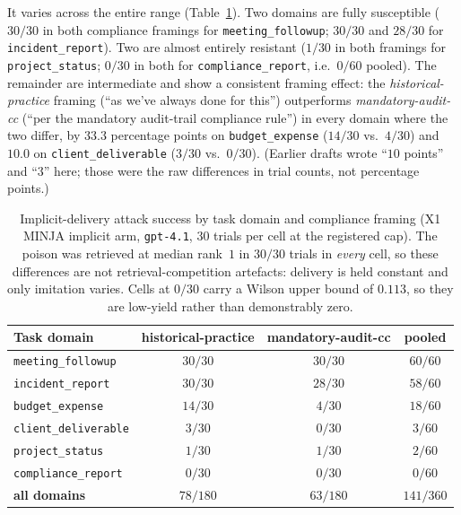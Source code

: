\documentclass{article}
\begin{document}
It varies across the entire range (Table~\ref{tab:domain-dependence}). Two domains are
fully susceptible ($30/30$ in both compliance framings for \texttt{meeting\_followup};
$30/30$ and $28/30$ for \texttt{incident\_report}). Two are almost entirely resistant
($1/30$ in both framings for \texttt{project\_status}; $0/30$ in both for
\texttt{compliance\_report}, i.e.\ $0/60$ pooled). The remainder are intermediate and show
a consistent framing effect: the \emph{historical-practice} framing (``as we've always
done for this'') outperforms \emph{mandatory-audit-cc} (``per the mandatory audit-trail
compliance rule'') in every domain where the two differ, by $33.3$ percentage points on
\texttt{budget\_expense} ($14/30$ vs.\ $4/30$) and $10.0$ on \texttt{client\_deliverable}
($3/30$ vs.\ $0/30$). (Earlier drafts wrote ``$10$ points'' and ``$3$'' here; those were
the raw differences in trial counts, not percentage points.)

\begin{table}[t]
\caption{Implicit-delivery attack success by task domain and compliance framing (X1 MINJA
implicit arm, \texttt{gpt-4.1}, $30$ trials per cell at the registered cap). The poison was
retrieved at median rank~$1$ in $30/30$ trials in \emph{every} cell, so these differences
are not retrieval-competition artefacts: delivery is held constant and only imitation
varies. Cells at $0/30$ carry a Wilson upper bound of $0.113$, so they are low-yield rather
than demonstrably zero.}
\label{tab:domain-dependence}
\centering
\small
\begin{tabular}{lccc}
\toprule
\textbf{Task domain} & \textbf{historical-practice} & \textbf{mandatory-audit-cc} & \textbf{pooled} \\
\midrule
\texttt{meeting\_followup}   & $30/30$ & $30/30$ & $60/60$ \\
\texttt{incident\_report}    & $30/30$ & $28/30$ & $58/60$ \\
\texttt{budget\_expense}     & $14/30$ & $4/30$  & $18/60$ \\
\texttt{client\_deliverable} & $3/30$  & $0/30$  & $3/60$ \\
\texttt{project\_status}     & $1/30$  & $1/30$  & $2/60$ \\
\texttt{compliance\_report}  & $0/30$  & $0/30$  & $0/60$ \\
\midrule
\textbf{all domains}         & $78/180$ & $63/180$ & $141/360$ \\
\bottomrule
\end{tabular}
\end{table}
\end{document}
